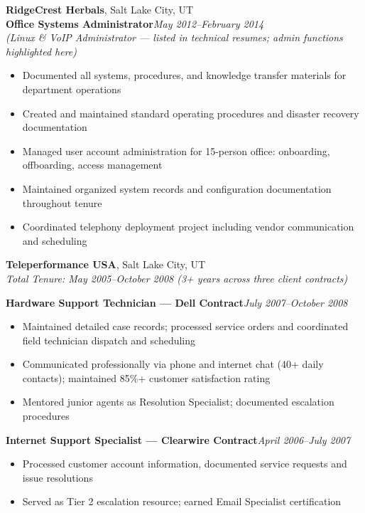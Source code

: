 \documentclass[9pt,letterpaper]{extarticle}
\begin{document}
\vspace{5pt}
\noindent\textbf{RidgeCrest Herbals}, Salt Lake City, UT\\
\textbf{Office Systems Administrator}\hfill\textit{May 2012--February 2014}\\
\textit{(Linux \& VoIP Administrator --- listed in technical resumes; admin functions highlighted here)}
\begin{itemize}
  \item Documented all systems, procedures, and knowledge transfer materials for department operations
  \item Created and maintained standard operating procedures and disaster recovery documentation
  \item Managed user account administration for 15-person office: onboarding, offboarding, access management
  \item Maintained organized system records and configuration documentation throughout tenure
  \item Coordinated telephony deployment project including vendor communication and scheduling
\end{itemize}

\newpage
\noindent\textbf{Teleperformance USA}, Salt Lake City, UT\\
\textit{Total Tenure: May 2005--October 2008 (3+ years across three client contracts)}

\smallskip
{}
\textbf{Hardware Support Technician --- Dell Contract}\hfill\textit{July 2007--October 2008}
\begin{itemize}
  \item Maintained detailed case records; processed service orders and coordinated field technician dispatch and scheduling
  \item Communicated professionally via phone and internet chat (40+ daily contacts); maintained 85\%+ customer satisfaction rating
  \item Mentored junior agents as Resolution Specialist; documented escalation procedures
\end{itemize}

\textbf{Internet Support Specialist --- Clearwire Contract}\hfill\textit{April 2006--July 2007}
\begin{itemize}
  \item Processed customer account information, documented service requests and issue resolutions
  \item Served as Tier 2 escalation resource; earned Email Specialist certification
\end{itemize}
\end{document}
